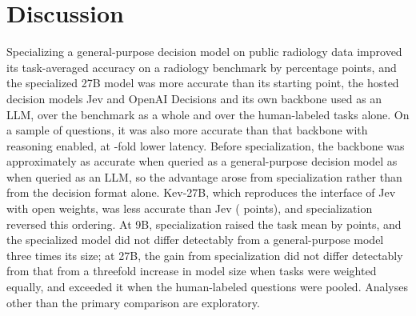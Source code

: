 \FloatBarrier
\section{Discussion}\label{sec:discussion}

Specializing a general-purpose decision model on public radiology data improved its task-averaged accuracy on a radiology benchmark by  percentage points, and the specialized 27B model was more accurate than its starting point, the hosted decision models Jev and OpenAI Decisions and its own backbone used as an LLM, over the benchmark as a whole and over the human-labeled tasks alone. On a sample of  questions, it was also more accurate than that backbone with reasoning enabled, at -fold lower latency. %
Before specialization, the backbone was approximately as accurate when queried as a general-purpose decision model as when queried as an LLM, so the advantage arose from specialization rather than from the decision format alone. %
Kev-27B, which reproduces the interface of Jev with open weights, was less accurate than Jev ( points), and specialization reversed this ordering. %
At 9B, specialization raised the task mean by  points, and the specialized model did not differ detectably from a general-purpose model three times its size; at 27B, the gain from specialization did not differ detectably from that from a threefold increase in model size when tasks were weighted equally, and exceeded it when the human-labeled questions were pooled. %
Analyses other than the primary comparison are exploratory.

